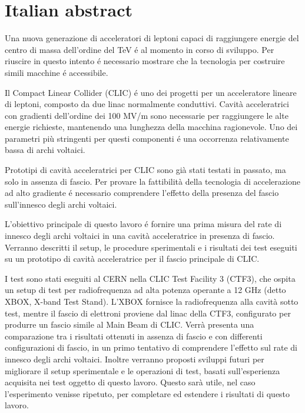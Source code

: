\chapter*{Italian abstract}

Una nuova generazione di acceleratori di leptoni capaci di raggiungere energie del centro di massa dell'ordine del TeV é al momento in corso di sviluppo. Per riuscire in questo intento é necessario mostrare che la tecnologia per costruire simili macchine é accessibile.

Il Compact Linear Collider (CLIC) é uno dei progetti per un acceleratore lineare di leptoni, composto da due linac normalmente conduttivi. Cavit\`a acceleratrici con gradienti dell'ordine dei 100 MV/m sono necessarie per raggiungere le alte energie richieste, mantenendo una lunghezza della macchina ragionevole. Uno dei parametri pi\`u stringenti per questi componenti é una occorrenza relativamente bassa di archi voltaici.

Prototipi di cavit\`a acceleratrici per CLIC sono gi\`a stati testati in passato, ma solo in assenza di fascio. Per provare la fattibilit\`a della tecnologia di accelerazione ad alto gradiente é necessario comprendere l'effetto della presenza del fascio sull'innesco degli archi voltaici.

L'obiettivo principale di questo lavoro é fornire una prima misura del rate di innesco degli archi voltaici in una cavit\`a acceleratrice in presenza di fascio. Verranno descritti il setup, le procedure sperimentali e i risultati dei test eseguiti su un prototipo di cavit\`a acceleratrice per il fascio principale di CLIC.

I test sono stati eseguiti al CERN nella CLIC Test Facility 3 (CTF3), che ospita un setup di test per radiofrequenza ad alta potenza operante a 12 GHz (detto XBOX, X-band Test Stand). L'XBOX fornisce la radiofrequenza alla cavit\`a sotto test, mentre il fascio di elettroni proviene dal linac della CTF3, configurato per produrre un fascio simile al Main Beam di CLIC. Verr\`a presenta una comparazione tra i risultati ottenuti in assenza di fascio e con differenti configurazioni di fascio, in un primo tentativo di comprendere l'effetto sul rate di innesco degli archi voltaici. Inoltre verranno proposti sviluppi futuri per migliorare il setup sperimentale e le operazioni di test, basati sull'esperienza acquisita nei test oggetto di questo lavoro. Questo sar\`a utile, nel caso l'esperimento venisse ripetuto, per completare ed estendere i risultati di questo lavoro.